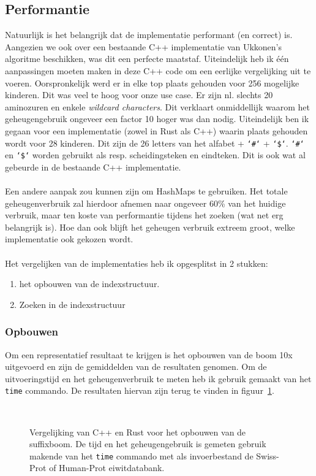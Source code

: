 \subsection{Performantie}\label{subsec:performantie}
Natuurlijk is het belangrijk dat de implementatie performant (en correct) is.
Aangezien we ook over een bestaande C++ implementatie van Ukkonen's algoritme beschikken, was dit een perfecte maatstaf.
Uiteindelijk heb ik één aanpassingen moeten maken in deze C++ code om een eerlijke vergelijking uit te voeren.
Oorspronkelijk werd er in elke top plaats gehouden voor 256 mogelijke kinderen.
Dit was veel te hoog voor onze use case.
Er zijn nl. slechts 20 aminozuren en enkele \textit{wildcard characters}.
Dit verklaart onmiddellijk waarom het geheugengebruik ongeveer een factor 10 hoger was dan nodig.
Uiteindelijk ben ik gegaan voor een implementatie (zowel in Rust als C++) waarin plaats gehouden wordt voor 28 kinderen.
Dit zijn de 26 letters van het alfabet + \texttt{`\#`} + \texttt{`\$`}.
\texttt{`\#`} en \texttt{`\$`} worden gebruikt als resp. scheidingsteken en eindteken.
Dit is ook wat al gebeurde in de bestaande C++ implementatie.
\\ \\
Een andere aanpak zou kunnen zijn om HashMaps te gebruiken.
Het totale geheugenverbruik zal hierdoor afnemen naar ongeveer 60\% van het huidige verbruik, maar ten koste van performantie tijdens het zoeken (wat net erg belangrijk is).
Hoe dan ook blijft het geheugen verbruik extreem groot, welke implementatie ook gekozen wordt.
\\ \\
Het vergelijken van de implementaties heb ik opgesplitst in 2 stukken:
\begin{enumerate}
    \item het opbouwen van de indexstructuur.
    \item Zoeken in de indexstructuur
\end{enumerate}

\subsubsection{Opbouwen}
Om een representatief resultaat te krijgen is het opbouwen van de boom 10x uitgevoerd en zijn de gemiddelden van de resultaten genomen.
Om de uitvoeringstijd en het geheugenverbruik te meten heb ik gebruik gemaakt van het \texttt{time} commando.
De resultaten hiervan zijn terug te vinden in figuur~\ref{fig:tree_building}.
\begin{figure}[H]
    \centering
    \\[4ex] %

    \caption{Vergelijking van C++ en Rust voor het opbouwen van de suffixboom. De tijd en het geheugengebruik is gemeten gebruik makende van het \texttt{time} commando met als invoerbestand de Swiss-Prot of Human-Prot eiwitdatabank.}\label{fig:tree_building}
\end{figure}

